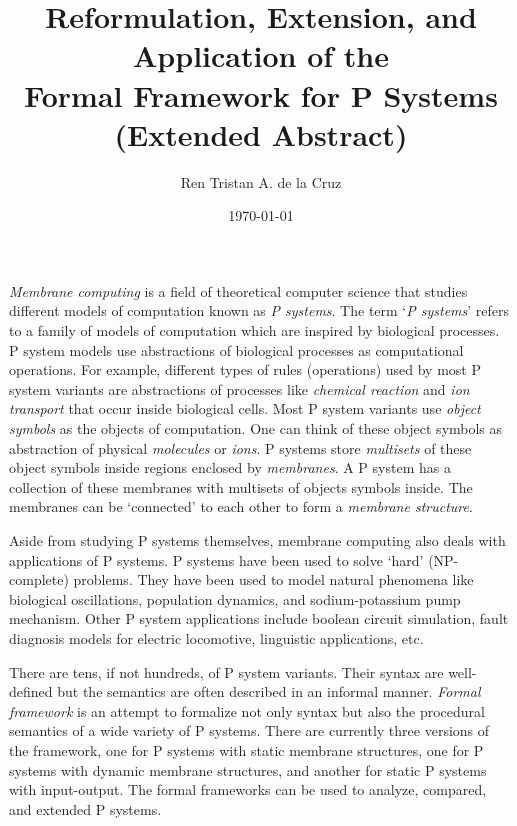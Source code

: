\documentclass{article}
\title
{
Reformulation, Extension, and Application of the\\
Formal Framework for P Systems ({Extended Abstract})
}
\date{\today}
\author{Ren Tristan A. de la Cruz}
\begin{document}
\maketitle


\begin{abstract}
\end{abstract}

\textit{Membrane computing} is a field of theoretical computer science that studies different models 
of computation known as \textit{P systems}. The term `\textit{P systems}' refers to a family of        
models of computation which are inspired by biological processes. P system models use abstractions     
of biological processes as computational operations. For example, different types of rules             
(operations) used by most P system variants are abstractions of processes like \textit{chemical        
reaction} and \textit{ion transport} that occur inside biological cells. Most P system variants use  
\textit{object symbols} as the objects of computation. One can think of these object symbols as        
abstraction of physical \textit{molecules} or \textit{ions}. P systems store \textit{multisets} of     
these object symbols inside regions enclosed by \textit{membranes}. A P system has a collection of     
these membranes with multisets of objects symbols inside. The membranes can be `connected' to each     
other to form a \textit{membrane structure}.                                                           
                                                                                                       
Aside from studying P systems themselves, membrane computing also deals with applications of           
P systems. P systems have been used to solve `hard' (NP-complete) problems. They have been used to     
model natural phenomena like biological oscillations, population dynamics, and sodium-potassium pump 
mechanism. Other P system applications include boolean circuit simulation, fault diagnosis models      
for electric locomotive, linguistic applications, etc.                                                 
                                                                                                       
There are tens, if not hundreds, of P system variants. Their syntax are well-defined but the           
semantics are often described in an informal manner. \emph{Formal framework} is an attempt to          
formalize not only syntax but also the procedural semantics of a wide variety of P systems. There      
are currently three versions of the framework, one for P systems with static membrane structures,      
one for P systems with dynamic membrane structures, and another for static P systems with              
input-output. The formal frameworks can be used to analyze, compared, and extended P systems.          
                                                                                                       
\end{document}
